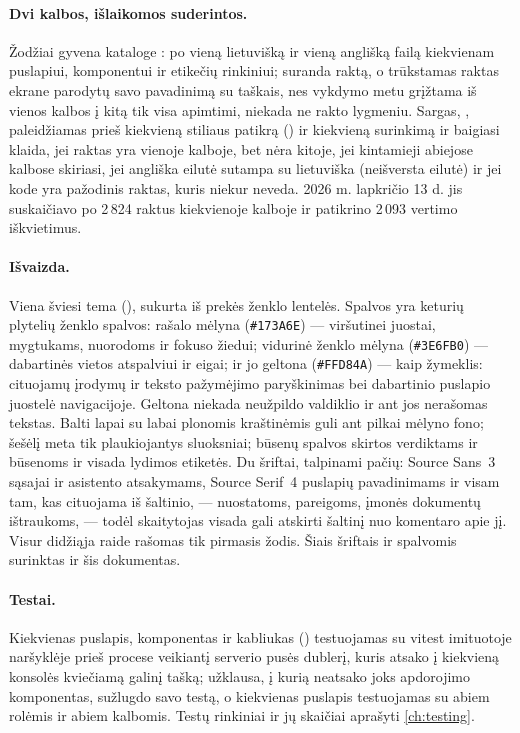 \paragraph{Dvi kalbos, išlaikomos suderintos.} Žodžiai gyvena kataloge : po vieną
lietuvišką ir vieną anglišką failą kiekvienam puslapiui, komponentui ir etikečių rinkiniui;
 suranda raktą, o trūkstamas raktas ekrane parodytų savo pavadinimą su taškais,
nes vykdymo metu grįžtama iš vienos kalbos į kitą tik visa apimtimi, niekada ne rakto lygmeniu.
Sargas, , paleidžiamas prieš kiekvieną stiliaus patikrą
() ir kiekvieną surinkimą ir baigiasi klaida, jei raktas yra vienoje kalboje, bet nėra
kitoje, jei kintamieji abiejose kalbose skiriasi, jei angliška eilutė sutampa su lietuviška
(neišversta eilutė) ir jei kode yra pažodinis raktas, kuris niekur neveda. 2026 m. lapkričio
13 d. jis suskaičiavo po 2\,824 raktus kiekvienoje kalboje ir patikrino 2\,093 vertimo
iškvietimus.

\paragraph{Išvaizda.} Viena šviesi tema (), sukurta iš prekės ženklo lentelės.
Spalvos yra keturių plytelių ženklo spalvos: rašalo mėlyna (\texttt{\#173A6E}) --- viršutinei juostai,
mygtukams, nuorodoms ir fokuso žiedui; vidurinė ženklo mėlyna (\texttt{\#3E6FB0}) --- dabartinės
vietos atspalviui ir eigai; ir jo geltona (\texttt{\#FFD84A}) --- kaip žymeklis: cituojamų
įrodymų ir teksto pažymėjimo paryškinimas bei dabartinio puslapio juostelė navigacijoje. Geltona
niekada neužpildo valdiklio ir ant jos nerašomas tekstas. Balti lapai su labai plonomis kraštinėmis guli
ant pilkai mėlyno fono; šešėlį meta tik plaukiojantys sluoksniai; būsenų spalvos skirtos
verdiktams ir būsenoms ir visada lydimos etiketės. Du šriftai, talpinami pačių: Source Sans~3
sąsajai ir asistento atsakymams, Source Serif~4 puslapių pavadinimams ir visam tam, kas cituojama
iš šaltinio, --- nuostatoms, pareigoms, įmonės dokumentų ištraukoms, --- todėl skaitytojas visada
gali atskirti šaltinį nuo komentaro apie jį. Visur didžiąja raide rašomas tik pirmasis žodis. Šiais šriftais ir spalvomis surinktas ir šis dokumentas.

\paragraph{Testai.} Kiekvienas puslapis, komponentas ir kabliukas () testuojamas su
vitest imituotoje naršyklėje prieš procese veikiantį serverio pusės dublerį, kuris atsako į
kiekvieną konsolės kviečiamą galinį tašką; užklausa, į kurią neatsako joks apdorojimo
komponentas, sužlugdo savo testą, o kiekvienas puslapis testuojamas su abiem rolėmis ir abiem
kalbomis. Testų rinkiniai ir jų skaičiai aprašyti \cref{ch:testing}.
